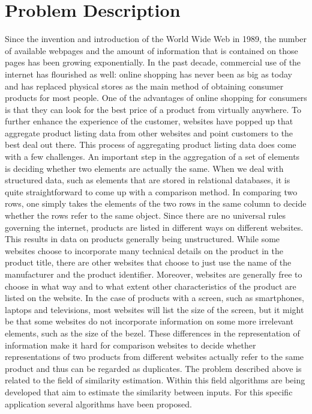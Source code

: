 \section{Problem Description}
Since the invention and introduction of the World Wide Web in 1989, the number of available webpages and the amount of information that is contained on those pages has been growing exponentially. In the past decade, commercial use of the internet has flourished as well: online shopping has never been as big as today and has replaced physical stores as the main method of obtaining consumer products for most people. One of the advantages of online shopping for consumers is that they can look for the best price of a product from virtually anywhere. To further enhance the experience of the customer, websites have popped up that aggregate product listing data from other websites and point customers to the best deal out there. 
This process of aggregating product listing data does come with a few challenges. An important step in the aggregation of a set of elements is deciding whether two elements are actually the same. When we deal with structured data, such as elements that are stored in relational databases, it is quite straightforward to come up with a comparison method. In comparing two rows, one simply takes the elements of the two rows in the same column to decide whether the rows refer to the same object. 
Since there are no universal rules governing the internet, products are listed in different ways on different websites. This results in data on products generally being unstructured. While some websites choose to incorporate many technical details on the product in the product title, there are other websites that choose to just use the name of the manufacturer and the product identifier. Moreover, websites are generally free to choose in what way and to what extent other characteristics of the product are listed on the website. In the case of products with a screen, such as smartphones, laptops and televisions, most websites will list the size of the screen, but it might be that some websites do not incorporate information on some more irrelevant elements, such as the size of the bezel. These differences in the representation of information make it hard for comparison websites to decide whether representations of two products from different websites actually refer to the same product and thus can be regarded as duplicates. 
The problem described above is related to the field of similarity estimation. Within this field algorithms are being developed that aim to estimate the similarity between inputs. For this specific application several algorithms have been proposed.
